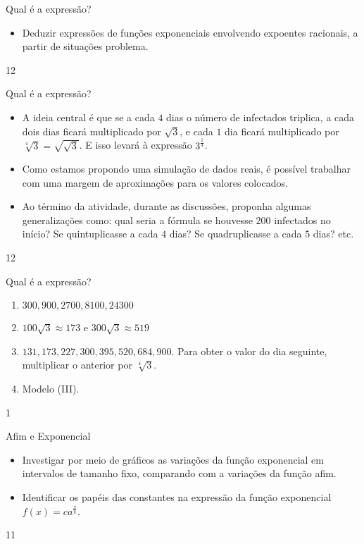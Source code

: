 \clearmargin
\begin{objectives}{Qual é a expressão?}
{
\begin{itemize}
\item Deduzir expressões de funções exponenciais envolvendo expoentes racionais, a partir de situações problema.

\end{itemize}
}{1}{2}
\end{objectives}
\begin{sugestions}{Qual é a expressão?}
{
\begin{itemize}
\item A ideia central é que se a cada $4$ dias o número de infectados triplica, a cada dois dias ficará multiplicado por $\sqrt{3}$, e cada $1$ dia ficará multiplicado por $\sqrt[4]{3}=\sqrt{\sqrt{3}}$. E isso levará à expressão $3^{\frac 14}$.

\item Como estamos propondo uma simulação de dados reais, é possível trabalhar com uma margem de aproximações para os valores colocados.

\item Ao término da atividade, durante as discussões, proponha algumas generalizações como: qual seria a fórmula se houvesse $200$ infectados no início? Se quintuplicasse a cada $4$ dias? Se quadruplicasse a cada $5$ dias? etc.

\end{itemize}
}{1}{2}
\end{sugestions}
\begin{answer}{Qual é a expressão?}
{
\begin{enumerate}

\item $300, 900, 2700, 8100, 24300$

\item $100\sqrt{3} \approx 173$ e $300\sqrt{3} \approx 519$

\item $131, 173, 227, 300, 395, 520, 684, 900$. Para obter o valor do dia seguinte, multiplicar o anterior por $\sqrt[4]{3}$.

\item Modelo (III).
\end{enumerate}
}{1}
\end{answer}
\clearmargin
\begin{objectives}{Afim e Exponencial}
{
\begin{itemize}
\item Investigar por meio de gráficos as variações da função exponencial em intervalos de tamanho fixo, comparando com a variações da função afim.

\item Identificar os papéis das constantes na expressão da função exponencial $f(x)=ca^{\frac xk}$.

\end{itemize}
}{1}{1}
\end{objectives}
